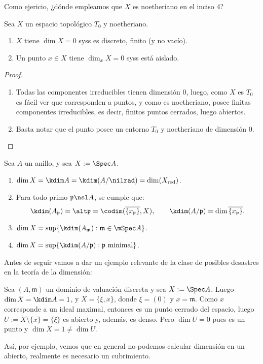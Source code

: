 Como ejericio, ¿dónde empleamos que $X$ es noetheriano en el inciso 4?

\begin{cor}\label{thm:isol_iff_loc_dim_zero}
	Sea $X$ un espacio topológico $T_0$ y noetheriano.
	\begin{enumerate}
		\item $X$ tiene $\dim X = 0$ syss es discreto, finito (y no vacío).
		\item Un punto $x \in X$ tiene $\dim_x X = 0$ syss está aislado.
	\end{enumerate}
\end{cor}
\begin{proof}
	\begin{enumerate}
		\item Todas las componentes irreducibles tienen dimensión 0, luego, como $X$ es $T_0$ es fácil ver que corresponden a puntos,
			y como es noetheriano, posee finitas componentes irreducibles, es decir, finitos puntos cerrados, luego abiertos.
		\item Basta notar que el punto posee un entorno $T_0$ y noetheriano de dimensión 0. \qedhere
	\end{enumerate}
\end{proof}

\begin{prop}
	Sea $A$ un anillo, y sea $X := \Spec A$.
	\begin{enumerate}
		\item $\dim X = \kdim A = \kdim(A/\nilrad) = \dim(X_{\rm red})$.
		\item Para todo primo $\mathfrak{p} \nsl A$, se cumple que:
			$$ \kdim(A_{\mathfrak{p}}) = \alt\mathfrak{p} = \codim(\overline{\{ x_{\mathfrak{p}} \}}, X), \qquad
			\kdim(A/\mathfrak{p}) = \dim\overline{\{ x_{\mathfrak{p}} \}}. $$
		\item $\dim X = \sup\{ \kdim(A_{\mathfrak{m}}) : \mathfrak{m} \in \mSpec A \}$.
		\item $\dim X = \sup\{ \kdim(A/\mathfrak{p}) : \mathfrak{p} \text{ minimal} \}$.
	\end{enumerate}
\end{prop}
Antes de seguir vamos a dar un ejemplo relevante de la clase de posibles desastres en la teoría de la dimensión:
\begin{ex}
	Sea $(A, \mathfrak{m})$ un dominio de valuación discreta y sea $X := \Spec A$.
	Luego $\dim X = \kdim A = 1$, y $X = \{ \xi, x \}$, donde $\xi = (0)$ y $x = \mathfrak{m}$.
	Como $x$ corresponde a un ideal maximal, entonces es un punto cerrado del espacio, luego $U := X \setminus \{ x \} = \{ \xi \}$ es abierto
	y, además, es denso.
	Pero $\dim U = 0$ pues es un punto y $\dim X = 1 \ne \dim U$.
\end{ex}
Así, por ejemplo, vemos que en general no podemos calcular dimensión en un abierto, realmente es necesario un cubrimiento.

